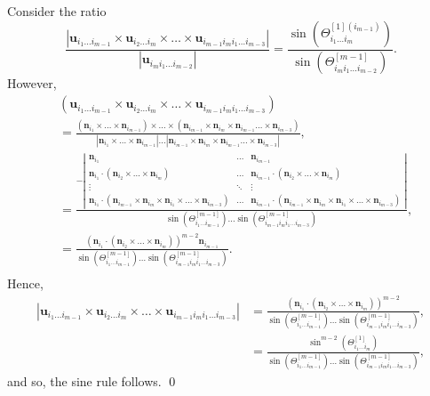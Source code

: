 \documentclass[fleqn,11pt,twoside]{article}
\makeatletter
\renewenvironment{proof}[1][\proofname]{\par
  \normalfont
  \topsep6\p@\@plus6\p@ \trivlist
  \item[\hskip\labelsep\textbf{%
    #1\@addpunct{.}}]\ignorespaces
}{%
  \qed\endtrivlist
}
\theoremstyle{definition}
\makeatother
\begin{document}
\begin{proof}
Consider the ratio
\begin{equation}
\frac{|\mathbf{u}_{i_1\dots i_{m-1}}\times\mathbf{u}_{i_2\dots i_{m}}\times\dots\times\mathbf{u}_{i_{m-1}i_mi_1\dots i_{m-3}}|}{|\mathbf{u}_{i_mi_1\dots i_{m-2}}|}
=\frac{\sin\left(\Theta^{[1](i_{m-1})}_{i_1\dots i_{m}}\right)}{\sin\left(\Theta^{[m-1]}_{i_mi_1\dots i_{m-2}}\right)}.
\end{equation}
However,
\begin{equation}\label{eq:84}
\begin{split}
&(\mathbf{u}_{i_1\dots i_{m-1}}\times\mathbf{u}_{i_2\dots i_{m}}\times\dots\times\mathbf{u}_{i_{m-1}i_mi_1\dots i_{m-3}})\\
&=\frac{(\mathbf{n}_{i_1}\times\dots\times\mathbf{n}_{i_{m-1}})\times\dots\times(\mathbf{n}_{i_{m-1}}\times \mathbf{n}_{i_m}\times \mathbf{n}_{i_{m-1}}\dots\times\mathbf{n}_{i_{m-3}})}{|\mathbf{n}_{i_1}\times\dots\times\mathbf{n}_{i_{m-1}}|\dots|\mathbf{n}_{i_{m-1}}\times \mathbf{n}_{i_m}\times \mathbf{n}_{i_{m-1}}\dots\times\mathbf{n}_{i_{m-3}}|},\\
&=\frac{-\left|\begin{array}{ccc}
\mathbf{n}_{i_{1}} & \dots & \mathbf{n}_{i_{m-1}}\\
\mathbf{n}_{i_{1}}\cdot(\mathbf{n}_{i_{2}}\times\dots\times\mathbf{n}_{i_{m}})& \dots & \mathbf{n}_{i_{m-1}}\cdot(\mathbf{n}_{i_{2}}\times\dots\times\mathbf{n}_{i_{m}})\\
\vdots & \ddots & \vdots \\
\mathbf{n}_{i_{1}}\cdot(\mathbf{n}_{i_{m-1}}\times\mathbf{n}_{i_{m}}\times\mathbf{n}_{i_{1}}\times\dots\times\mathbf{n}_{i_{m-3}}) & \dots &
\mathbf{n}_{i_{m-1}}\cdot(\mathbf{n}_{i_{m-1}}\times\mathbf{n}_{i_{m}}\times\mathbf{n}_{i_{1}}\times\dots\times\mathbf{n}_{i_{m-3}})
\end{array}\right|}
{\sin\left(\Theta^{[m-1]}_{i_1\dots i_{m-1}}\right)\dots\sin\left(\Theta^{[m-1]}_{i_{m-1}i_mi_1\dots i_{m-3}}\right)},\\
&=\frac{(\mathbf{n}_{i_{1}}\cdot(\mathbf{n}_{i_{2}}\times\dots\times\mathbf{n}_{i_{m}}))^{m-2}\mathbf{n}_{i_{m-1}}}{\sin\left(\Theta^{[m-1]}_{i_1\dots i_{m-1}}\right)\dots\sin\left(\Theta^{[m-1]}_{i_{m-1}i_mi_1\dots i_{m-3}}\right)}.\\
\end{split}
\end{equation}
Hence,
\begin{equation}
\begin{split}
|\mathbf{u}_{i_1\dots i_{m-1}}\times\mathbf{u}_{i_2\dots i_{m}}\times\dots\times\mathbf{u}_{i_{m-1}i_mi_1\dots i_{m-3}}|&=\frac{(\mathbf{n}_{i_{1}}\cdot(\mathbf{n}_{i_{2}}\times\dots\times\mathbf{n}_{i_{m}}))^{m-2}}{\sin(\Theta^{[m-1]}_{i_1\dots i_{m-1}})\dots\sin\left(\Theta^{[m-1]}_{i_{m-1}i_mi_1\dots i_{m-3}}\right)},\\
&=\frac{\sin^{m-2}\left(\Theta^{[1]}_{i_1\dots i_m}\right)}{\sin\left(\Theta^{[m-1]}_{i_1\dots i_{m-1}}\right)\dots\sin\left(\Theta^{[m-1]}_{i_{m-1}i_mi_1\dots i_{m-3}}\right)},
\end{split}
\end{equation}
and so, the sine rule follows.
\end{proof}
\end{document}
